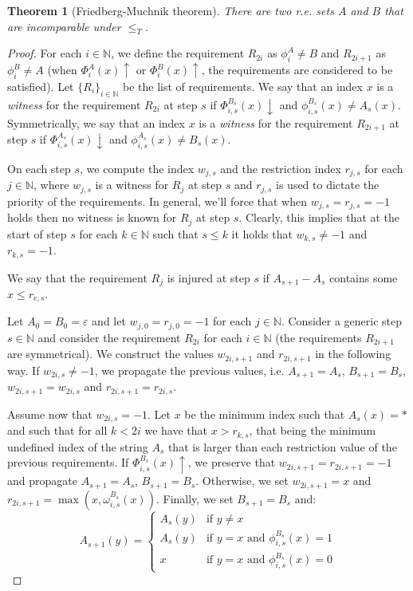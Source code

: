\documentclass[12pt,a4paper]{article}
\newtheorem{theorem}{Theorem}
\theoremstyle{definition}
\newcommand{\N}{\mathbb{N}}                     %
\begin{document}
    \begin{theorem}[Friedberg-Muchnik theorem]
        There are two r.e. sets $A$ and $B$ that are incomparable under $\leq_T$.
    \end{theorem}

    \begin{proof}
        For each $i \in \N$, we define the requirement $R_{2i}$ as $\phi_i^A \neq B$ and $R_{2i+1}$ as $\phi_{i}^B \neq A$ (when $\Phi_i^A(x) \uparrow$ or $\Phi_i^B(x) \uparrow$, the requirements are considered to be satisfied). Let $\{R_i\}_{i \in \N}$ be the list of requirements. We say that an index $x$ is a \textit{witness} for the requirement $R_{2i}$ at step $s$ if $\Phi_{i,s}^{B_s}(x) \downarrow$ and $\phi_{i,s}^{B_s}(x) \neq A_s(x)$. Symmetrically, we say that an index $x$ is a \textit{witness} for the requirement $R_{2i+1}$ at step $s$ if $\Phi_{i,s}^{A_s}(x) \downarrow$ and $\phi_{i,s}^{A_s}(x) \neq B_s(x)$.

        On each step $s$, we compute the index $w_{j,s}$ and the restriction index $r_{j,s}$ for each $j \in \N$, where $w_{j,s}$ is a witness for $R_j$ at step $s$ and $r_{j,s}$ is used to dictate the priority of the requirements.
        In general, we'll force that when $w_{j,s} = r_{j,s} = -1$ holds then no witness is known for $R_j$ at step $s$. Clearly, this implies that at the start of step $s$ for each $k \in \N$ such that $s \leq k$ it holds that $w_{k,s} \neq -1$ and $r_{k,s} = -1$.

        We say that the requirement $R_j$ is injured at step $s$ if $A_{s+1}- A_s$ contains some $x \leq r_{e,s}$.

        Let $A_0 = B_0 = \varepsilon$ and let $w_{j,0} = r_{j,0} = -1$ for each $j \in \N$. Consider a generic step $s \in \N$ and consider the requirement $R_{2i}$ for each $i \in \N$ (the requirements $R_{2i+1}$ are symmetrical). We construct the values $w_{2i,s+1}$ and $r_{2i,s+1}$ in the following way. If $w_{2i,s} \neq -1$, we propagate the previous values, i.e. $A_{s+1} = A_s$, $B_{s+1} = B_s$, $w_{2i,s+1} = w_{2i,s}$ and $r_{2i,s+1} = r_{2i,s}$.

        Assume now that $w_{2i,s} = -1$. Let $x$ be the minimum index such that $A_s(x) = *$ and such that for all $k < 2i$ we have that $x > r_{k,s}$, that being the minimum undefined index of the string $A_s$ that is larger than each restriction value of the previous requirements. If $\Phi_{i,s}^{B_s}(x) \uparrow$, we preserve that $w_{2i,s+1} = r_{2i,s+1} = -1$ and propagate $A_{s+1} = A_s$, $B_{s+1} = B_s$. Otherwise, we set $w_{2i,s+1} = x$ and $r_{2i,s+1} = \max(x, \omega_{i,s}^{B_s}(x))$. Finally, we set $B_{s+1} = B_s$ and:
        \[A_{s+1}(y) = \left \{ \begin{array}{ll}
            A_{s}(y)  & \text{if } y \neq x \\
            A_s(y) & \text{if } y = x \text{ and }  \phi_{i,s}^{B_s}(x) = 1 \\
            x & \text{if } y = x \text{ and }  \phi_{i,s}^{B_s}(x) = 0
        \end{array}\right .\]


\end{proof}
\end{document}
